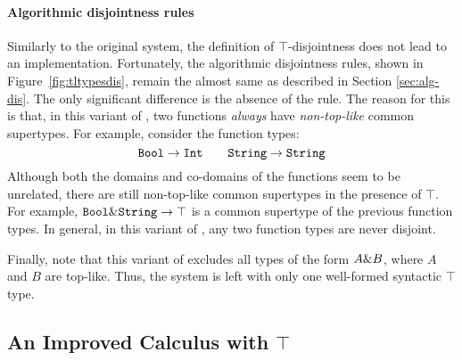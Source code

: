 





\paragraph{Algorithmic disjointness rules}

Similarly to the original system, the definition of $\top$-disjointness
does not lead to an implementation.  Fortunately, the algorithmic
disjointness rules, shown in Figure~\ref{fig:tltypesdis}, remain the almost same as described in Section
\ref{sec:alg-dis}. The only significant difference is the absence
of the  rule. The reason for this is that, in
this variant of \name, two functions \emph{always} have \emph{non-top-like} common 
supertypes. For example, consider the function types:
\[ \texttt{Bool} \to \texttt{Int} \qquad \texttt{String} \to \texttt{String} \]
Although both the domains and co-domains of the functions seem 
to be unrelated, there are still non-top-like common supertypes in the presence of 
$\top$. For example, $\texttt{Bool}\&\texttt{String} \to \texttt{$\top$}$
is a common supertype of the previous function types. In general, in
this variant of \name, any two function types are never disjoint.

Finally, note that this variant of \name excludes all types of the form
$A \& B$, where $A$  and $B$ are top-like. Thus,
the system is left with only one well-formed syntactic $\top$ type.



\subsection{An Improved Calculus with $\top$}

